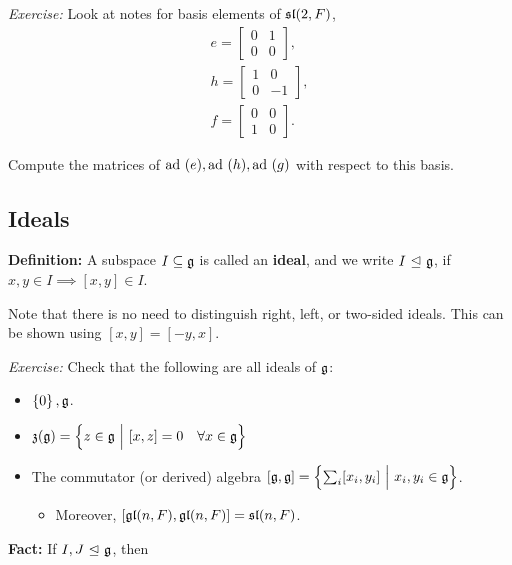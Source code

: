 \emph{Exercise:} Look at notes for basis elements of \({\mathfrak{sl}}(2, F)\),
\begin{align*}
e=\left[\begin{array}{ll}{0} & {1} \\ {0} & {0}\end{array}\right],\\
h=\left[\begin{array}{cc}{1} & {0} \\ {0} & {-1}\end{array}\right],\\
f=\left[\begin{array}{ll}{0} & {0} \\ {1} & {0}\end{array}\right]
.\end{align*}

Compute the matrices of \(\mathrm{ad}~(e), \mathrm{ad}~(h), \mathrm{ad}~(g)\) with respect to this
basis.

\hypertarget{ideals}{%
\subsection{Ideals}\label{ideals}}

\textbf{Definition:} A subspace \(I \subseteq {\mathfrak{g}}\) is called an
\textbf{ideal}, and we write \(I {~\trianglelefteq~} {\mathfrak{g}}\), if
\(x,y \in I \implies [x,y]\in I\).

Note that there is no need to distinguish right, left, or two-sided
ideals. This can be shown using \([x,y] = [-y, x]\).

\emph{Exercise:} Check that the following are all ideals of \({\mathfrak{g}}\):

\begin{itemize}
\tightlist
\item
  \(\left\{{0}\right\}, {\mathfrak{g}}\).
\item
  \(\mathfrak z ({\mathfrak{g}}) = \left\{{z\in {\mathfrak{g}} {~\mathrel{\Big|}~} [x, z] = 0\quad \forall x\in {\mathfrak{g}}}\right\}\)
\item
  The commutator (or derived) algebra
  \([{\mathfrak{g}}, {\mathfrak{g}}] = \left\{{\sum_i [x_i, y_i] {~\mathrel{\Big|}~} x_i, y_i \in {\mathfrak{g}}}\right\}\).

  \begin{itemize}
  \tightlist
  \item
    Moreover, \([{\mathfrak{gl}}(n, F),{\mathfrak{gl}}(n, F) ] = {\mathfrak{sl}}(n, F)\).
  \end{itemize}
\end{itemize}

\textbf{Fact:} If \(I, J {~\trianglelefteq~} {\mathfrak{g}}\), then

